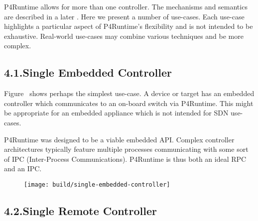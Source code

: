 \documentclass[11pt]{article}
\begin{document}
{%
\noindent{}P4Runtime allows for more than one controller. The mechanisms and semantics are
described in a later
. Here we
present a number of use-cases. Each use-case highlights a particular aspect of
P4Runtime's flexibility and is not intended to be exhaustive. Real-world
use-cases may combine various techniques and be more complex.%

\subsection{4.1.\hspace*{0.5em}Single Embedded Controller}\label{sec-single-embedded-controller}%

\noindent{}Figure~ shows perhaps the simplest use-case. A
device or target has an embedded controller which communicates to an on-board
switch via P4Runtime. This might be appropriate for an embedded appliance which
is not intended for SDN use-cases.%

P4Runtime was designed to be a viable embedded API. Complex controller
architectures typically feature multiple processes communicating with some sort
of IPC (Inter-Process Communications). P4Runtime is thus both an ideal RPC and
an IPC.%

\begin{figure}[tbp]%
\begin{mdcenter}%

\noindent{}\texttt{[image: build/single-embedded-controller]}{}%

\mdhr{}%

\noindent{}%
\end{mdcenter}\label{fig-single-embedded-controller}%
\end{figure}%

\subsection{4.2.\hspace*{0.5em}Single Remote Controller}\label{sec-single-remote-controller}%

}
\end{document}
